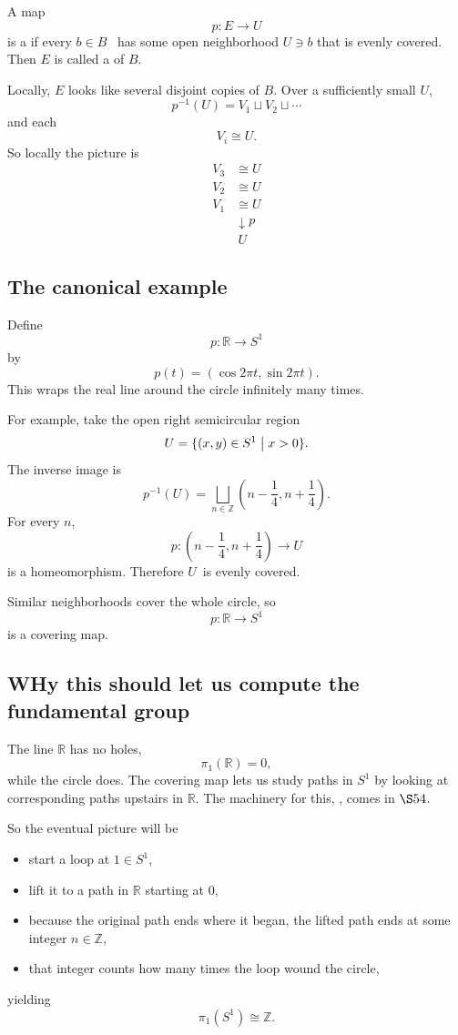 \documentclass[11pt]{article}
\begin{document}
A map 
\[
    p : E \to U
\]
is a  if every $b \in B$ 
has some open neighborhood $U \ni b$ that is evenly covered. 
Then $E$ is called a  of $B$.

Locally, $E$ looks like several disjoint copies of $B$. 
Over a sufficiently small $U$, 
\[
    p^{-1}(U) = V_1 \sqcup V_2 \sqcup \cdots 
\]
and each 
\[
    V_i \cong U. 
\]
So locally the picture is 
\begin{align*}
    V_3 &\cong U \\ 
    V_2 &\cong U \\ 
    V_1 &\cong U \\ 
        &\downarrow p \\ 
        & \  U
\end{align*}

\subsection{The canonical example}

Define 
\[
    p : \mathbb R \to S^1
\]
by 
\[
    p(t) = (\cos 2\pi t, \sin 2\pi t).
\]
This wraps the real line around the circle 
infinitely many times.

For example, take the open right semicircular region 
\[
    U = \{(x,y) \in S^1 \bigm| x > 0\}.
\]
The inverse image is 
\[
    p^{-1}(U)
=
\bigsqcup_{n\in\mathbb Z}
\left(n-\frac14,n+\frac14\right).
\]
For every $n$, 
\[
    p:
\left(n-\frac14,n+\frac14\right)
\longrightarrow U
\]
is a homeomorphism.
Therefore $U$ is evenly covered. 

Similar neighborhoods cover the whole circle, so 
\[
    p : \mathbb R \to S^1
\]
is a covering map.

\subsection{WHy this should let us compute the fundamental group}

The line $\mathbb R$ has no holes, 
\[
    \pi_1(\mathbb R) = 0,
\]
while the circle does. 
The covering map lets us study paths in $S^1$ by looking 
at corresponding paths upstairs in $\mathbb R$. 
The machinery for this, , 
comes in $\S 54$. 

So the eventual picture will be 
\begin{itemize}
    \item start a loop at $1\in S^1$, 
    \item lift it to a path in $\mathbb R$ starting at $0$, 
    \item because the original path ends where it began, 
        the lifted path ends at some integer $n\in\mathbb Z$, 
    \item that integer counts how many times the loop wound 
        the circle,  
\end{itemize}
yielding 
\[
    \pi_1(S^1) \cong \mathbb Z.
\]
\end{document}
